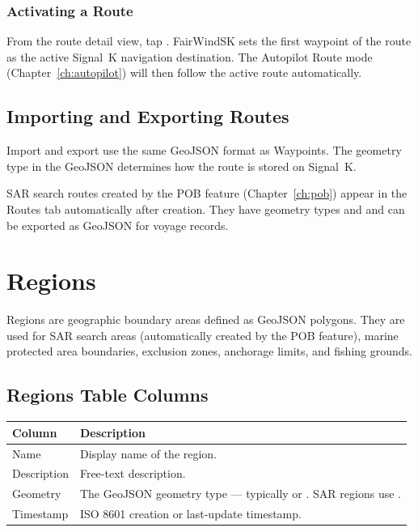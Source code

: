 \subsection{Activating a Route}

From the route detail view, tap .
FairWindSK sets the first waypoint of the route as the active Signal~K navigation destination.
The Autopilot Route mode (Chapter~\ref{ch:autopilot}) will then follow the active route automatically.

\section{Importing and Exporting Routes}

Import and export use the same GeoJSON  format as Waypoints.
The geometry type in the GeoJSON determines how the route is stored on Signal~K.

\begin{tipbox}
SAR search routes created by the POB feature (Chapter~\ref{ch:pob}) appear in the Routes tab
automatically after creation.
They have geometry types  and  and can be exported as GeoJSON
for voyage records.
\end{tipbox}

\chapter{Regions}
\label{ch:regions}

Regions are geographic boundary areas defined as GeoJSON polygons.
They are used for SAR search areas (automatically created by the POB feature), marine protected area
boundaries, exclusion zones, anchorage limits, and fishing grounds.


\section{Regions Table Columns}

\begin{longtable}{L{2.4cm} L{11.3cm}}
\toprule
{}
{\sffamily\bfseries\color{white} Column} &
{\sffamily\bfseries\color{white} Description} \\
\midrule
Name & Display name of the region. \\
Description & Free-text description. \\
Geometry & The GeoJSON geometry type --- typically  or . SAR regions use . \\
Timestamp & ISO 8601 creation or last-update timestamp. \\
\bottomrule
\end{longtable}

